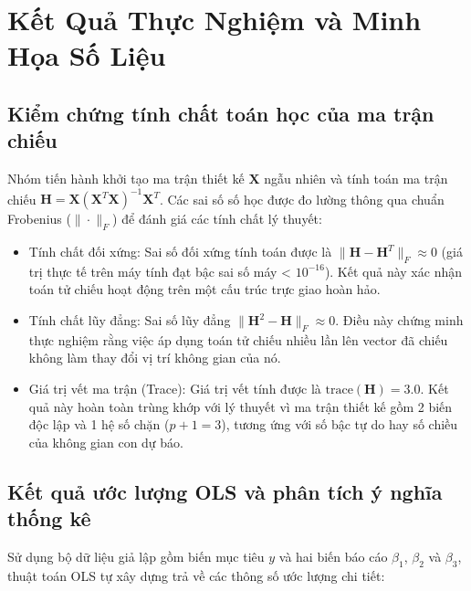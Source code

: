 \newpage

\section{Kết Quả Thực Nghiệm và Minh Họa Số Liệu}

\subsection{Kiểm chứng tính chất toán học của ma trận chiếu}

Nhóm tiến hành khởi tạo ma trận thiết kế $\mathbf{X}$ ngẫu nhiên và tính toán ma trận chiếu $\mathbf{H} = \mathbf{X}(\mathbf{X}^T\mathbf{X})^{-1}\mathbf{X}^T$. Các sai số số học được đo lường thông qua chuẩn Frobenius ($\|\cdot\|_F$) để đánh giá các tính chất lý thuyết:

\begin{itemize}[topsep=0pt, itemsep=2.5pt, leftmargin=1.5cm]
    \item Tính chất đối xứng: Sai số đối xứng tính toán được là $\|\mathbf{H} - \mathbf{H}^T\|_F \approx 0$ (giá trị thực tế trên máy tính đạt bậc sai số máy < $10^{-16}$). Kết quả này xác nhận toán tử chiếu hoạt động trên một cấu trúc trực giao hoàn hảo.
    \item Tính chất lũy đẳng: Sai số lũy đẳng $\|\mathbf{H}^2 - \mathbf{H}\|_F \approx 0$. Điều này chứng minh thực nghiệm rằng việc áp dụng toán tử chiếu nhiều lần lên vector đã chiếu không làm thay đổi vị trí không gian của nó.
    \item Giá trị vết ma trận (Trace): Giá trị vết tính được là $\text{trace}(\mathbf{H}) = 3.0$. Kết quả này hoàn toàn trùng khớp với lý thuyết vì ma trận thiết kế gồm 2 biến độc lập và 1 hệ số chặn ($p + 1 = 3$), tương ứng với số bậc tự do hay số chiều của không gian con dự báo.
\end{itemize}

\subsection{Kết quả ước lượng OLS và phân tích ý nghĩa thống kê}

Sử dụng bộ dữ liệu giả lập gồm biến mục tiêu $y$ và hai biến báo cáo $\beta_1$, $\beta_2$ và $\beta_3$, thuật toán OLS tự xây dựng trả về các thông số ước lượng chi tiết:

